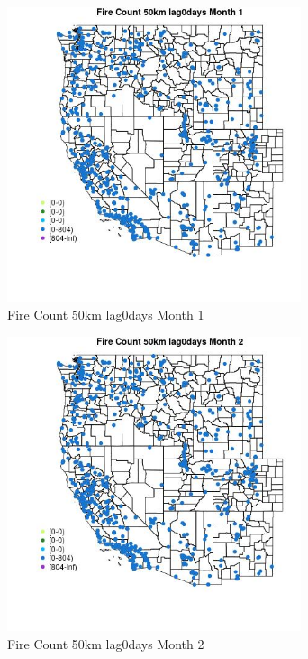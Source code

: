 \begin{figure} 
\centering  
\includegraphics[width=0.77\textwidth]{Code_Outputs/Report_ML_input_PM25_Step4_part_f_de_duplicated_aves_prioritize_24hr_obswNAs_MapObsMo1Fire_Count_50km_lag0days.jpg} 
\caption{\label{fig:Report_ML_input_PM25_Step4_part_f_de_duplicated_aves_prioritize_24hr_obswNAsMapObsMo1Fire_Count_50km_lag0days}Fire Count 50km lag0days Month 1} 
\end{figure} 
 

\begin{figure} 
\centering  
\includegraphics[width=0.77\textwidth]{Code_Outputs/Report_ML_input_PM25_Step4_part_f_de_duplicated_aves_prioritize_24hr_obswNAs_MapObsMo2Fire_Count_50km_lag0days.jpg} 
\caption{\label{fig:Report_ML_input_PM25_Step4_part_f_de_duplicated_aves_prioritize_24hr_obswNAsMapObsMo2Fire_Count_50km_lag0days}Fire Count 50km lag0days Month 2} 
\end{figure} 
 

